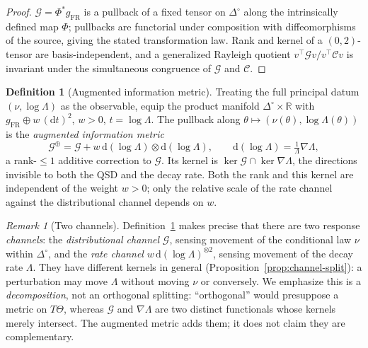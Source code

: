 \documentclass[11pt,reqno]{amsart}
\theoremstyle{plain}
\theoremstyle{definition}
\newtheorem{definition}[theorem]{Definition}
\theoremstyle{remark}
\newtheorem{remark}[theorem]{Remark}
\newcommand{\R}{\mathbb{R}}
\newcommand{\Simp}{\Delta^{\!\circ}}
\newcommand{\FR}{\mathrm{FR}}
\newcommand{\dd}{\mathrm{d}}
\begin{document}
\begin{proof}
$\mathcal G=\Phi^{*}g_{\FR}$ is a pullback of a fixed tensor on $\Simp$ along the
intrinsically defined map $\Phi$; pullbacks are functorial under composition with
diffeomorphisms of the source, giving the stated transformation law. Rank and
kernel of a $(0,2)$-tensor are basis-independent, and a generalized
Rayleigh quotient $v^\top\mathcal G v/v^\top\mathcal Cv$ is invariant under the
simultaneous congruence of $\mathcal G$ and $\mathcal C$.
\end{proof}

\begin{definition}[Augmented information metric]\label{def:augmented}
Treating the full principal datum $(\nu,\log\Lambda)$ as the observable, equip the
product manifold $\Simp\times\R$ with $g_{\FR}\oplus w\,(\dd t)^2$, $w>0$, $t=\log
\Lambda$. The pullback along $\theta\mapsto(\nu(\theta),\log\Lambda(\theta))$ is the
\emph{augmented information metric}
\begin{equation}\label{eq:augmented}
\mathcal G^{\oplus}=\mathcal G+w\,\dd(\log\Lambda)\otimes\dd(\log\Lambda),
\qquad
\dd(\log\Lambda)=\tfrac1\Lambda\nabla\Lambda,
\end{equation}
a rank-$\le1$ additive correction to $\mathcal G$. Its kernel is
$\ker\mathcal G\cap\ker\nabla\Lambda$, the directions invisible to both the QSD and
the decay rate. Both the rank and this kernel are independent of the weight $w>0$; only
the relative scale of the rate channel against the distributional channel depends on $w$.
\end{definition}

\begin{remark}[Two channels]\label{rem:channels}
Definition~\ref{def:augmented} makes precise that there are two response
\emph{channels}: the \emph{distributional channel} $\mathcal G$, sensing movement
of the conditional law $\nu$ within $\Simp$, and the \emph{rate channel}
$w\,\dd(\log\Lambda)^{\otimes2}$, sensing movement of the decay rate $\Lambda$. They
have different kernels in general (Proposition~\ref{prop:channel-split}): a
perturbation may move $\Lambda$ without moving $\nu$ or conversely. We emphasize
this is a \emph{decomposition}, not an orthogonal splitting: ``orthogonal'' would
presuppose a metric on $T\Theta$, whereas $\mathcal G$ and $\nabla\Lambda$ are two
distinct functionals whose kernels merely intersect. The augmented metric adds
them; it does not claim they are complementary.
\end{remark}
\end{document}
